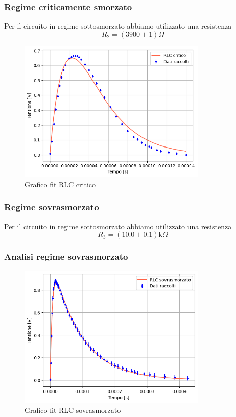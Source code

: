\documentclass[letterpaper,12pt]{article}
\begin{document}
\newpage

\subsubsection{Regime criticamente smorzato}
Per il circuito in regime sottosmorzato abbiamo utilizzato una resistenza $$R_2 =(3900\pm1) \Omega $$


\begin{figure}[h!] 
  \centering
  \includegraphics[width=0.8\textwidth]{RLCcritic.png} %
  \caption{Grafico fit RLC critico}
  \label{fig:fitRLCcritic}
\end{figure}
\newpage

\subsubsection{Regime sovrasmorzato}
Per il circuito in regime sottosmorzato abbiamo utilizzato una resistenza $$R_3 =(10.0\pm0.1)\text{k}\Omega $$

\subsubsection{Analisi regime sovrasmorzato}

\begin{figure}[h!] 
  \centering
  \includegraphics[width=0.8\textwidth]{RLCsovra.png} %
  \caption{Grafico fit RLC sovrasmorzato}
  \label{fig:fitRLCsovra}
\end{figure}
\end{document}
